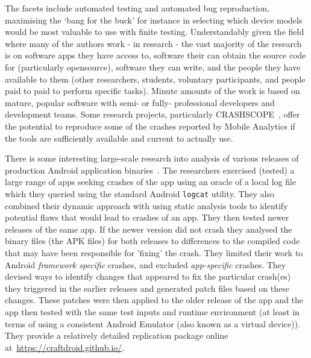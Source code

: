 The facets include automated testing and automated bug reproduction, maximising the `bang for the buck' for instance in selecting which device models would be most valuable to use with finite testing. Understandably given the field where many of the authors work - in research - the vast majority of the research is on software apps they have access to, software their can obtain the source code for (particularly opensource), software they can write, and the people they have available to them (other researchers, students, voluntary participants, and people paid to paid to perform specific tasks). Minute amounts of the work is based on mature, popular software with semi- or fully- professional developers and development teams. Some research projects, particularly CRASHSCOPE~\citep{moran2016_automatically_drr_android_app_crashes}, offer the potential to reproduce some of the crashes reported by Mobile Analytics if the tools are sufficiently available and current to actually use.



There is some interesting large-scale research into analysis of various releases of production Android application binaries~\citep{kong2019_mining_android_crash_fixes}. The researchers exercised (tested) a large range of apps seeking crashes of the app using an oracle of a local log file which they queried using the standard Android \texttt{logcat} utility. They also combined their dynamic approach with using static analysis tools to identify potential flaws that would lead to crashes of an app. They then tested newer releases of the same app. If the newer version did not crash they analysed the binary files (the APK files) for both releases to differences to the compiled code that may have been responsible for 'fixing' the crash. They limited their work to Android \emph{framework specific} crashes, and excluded \emph{app-specific} crashes. They devised ways to identify changes that appeared to fix the particular crash(es) they triggered in the earlier releases and generated patch files based on these changes. These patches were then applied to the older release of the app and the app then tested with the same test inputs and runtime environment (at least in terms of using a consistent Android Emulator (also known as a virtual device)). They provide a relatively detailed replication package online at~\url{https://craftdroid.github.io/}.

